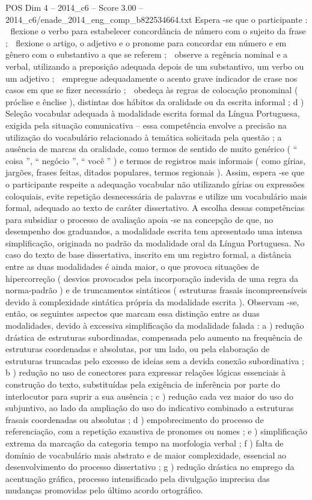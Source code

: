 \begin{textsample}{POS Dim 4 – 2014\_c6 – Score 3.00 – 2014\_c6/enade\_2014\_eng\_comp\_b822534664.txt}
Espera -se que o participante :  flexione o verbo para estabelecer concordância de número com o sujeito da frase ;  flexione o artigo, o adjetivo e o pronome para concordar em número e em gênero com o substantivo a que se referem ;  observe a regência nominal e a verbal, utilizando a preposição adequada depois de um substantivo, um verbo ou um adjetivo ;  empregue adequadamente o acento grave indicador de crase nos casos em que se fizer necessário ;  obedeça às regras de colocação pronominal ( próclise e ênclise ), distintas dos hábitos da oralidade ou da escrita informal ; d ) Seleção vocabular adequada à modalidade escrita formal da Língua Portuguesa, exigida pela situação comunicativa – essa competência envolve a precisão na utilização do vocabulário relacionado à temática solicitada pela questão ; a ausência de marcas da oralidade, como termos de sentido de muito genérico ( “ coisa ”, “ negócio ”, “ você ” ) e termos de registros mais informais ( como gírias, jargões, frases feitas, ditados populares, termos regionais ).
Assim, espera -se que o participante respeite a adequação vocabular não utilizando gírias ou expressões coloquiais, evite repetição desnecessária de palavras e utilize um vocabulário mais formal, adequado ao texto de caráter dissertativo.
A escolha dessas competências para subsidiar o processo de avaliação apoia -se na concepção de que, no desempenho dos graduandos, a modalidade escrita tem apresentado uma intensa simplificação, originada no padrão da modalidade oral da Língua Portuguesa.
No caso do texto de base dissertativa, inscrito em um registro formal, a distância entre as duas modalidades é ainda maior, o que provoca situações de hipercorreção ( desvios provocados pela incorporação indevida de uma regra da norma-padrão ) e de truncamentos sintáticos ( estruturas frasais incompreensíveis devido à complexidade sintática própria da modalidade escrita ).
Observam -se, então, os seguintes aspectos que marcam essa distinção entre as duas modalidades, devido à excessiva simplificação da modalidade falada : a ) redução drástica de estruturas subordinadas, compensada pelo aumento na frequência de estruturas coordenadas e absolutas, por um lado, ou pela elaboração de estruturas truncadas pelo excesso de ideias sem a devida conexão subordinativa ; b ) redução no uso de conectores para expressar relações lógicas essenciais à construção do texto, substituídas pela exigência de inferência por parte do interlocutor para suprir a sua ausência ; c ) redução cada vez maior do uso do subjuntivo, ao lado da ampliação do uso do indicativo combinado a estruturas frasais coordenadas ou absolutas ; d ) empobrecimento do processo de referenciação, com a repetição exaustiva de pronomes ou nomes ; e ) simplificação extrema da marcação da categoria tempo na morfologia verbal ; f ) falta de domínio de vocabulário mais abstrato e de maior complexidade, essencial ao desenvolvimento do processo dissertativo ; g ) redução drástica no emprego da acentuação gráfica, processo intensificado pela divulgação imprecisa das mudanças promovidas pelo último acordo ortográfico.

\end{textsample}
